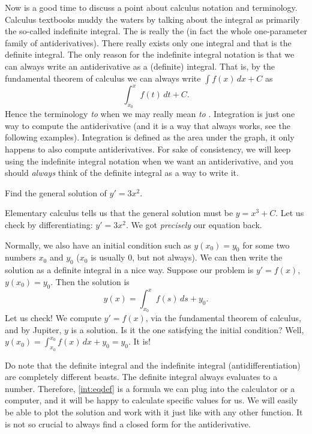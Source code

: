 Now is a good time to discuss a point about
calculus notation and terminology.  Calculus
textbooks muddy the waters by talking about the integral as primarily the
so-called indefinite integral.  The 
is really the \emph{} 
(in fact the whole one-parameter family
of antiderivatives).  There really exists only one integral and that
is the definite integral.
The only reason for the indefinite integral notation is that we can always
write an antiderivative as a (definite) integral.  That is, by the fundamental
theorem of calculus we can always write
$\int f(x) \,dx + C$ as
\begin{equation*}
\int_{x_0}^x f(t) \,dt + C .
\end{equation*}
Hence the terminology \emph{to } when we may really mean
\emph{to }.
Integration is just one way to compute the
antiderivative (and it is a way that always works, see the following
examples).  Integration is defined as the area under the graph, it
only happens to also compute antiderivatives.
For sake of consistency, we will keep using the
indefinite integral notation when we want an antiderivative,
and you should \emph{always} think of the definite integral
as a way to write it.

\begin{example}
Find the general solution of $y' = 3 x^2$.

Elementary calculus tells us
that the general solution must be $y = x^3 + C$.  Let us check by
differentiating:
$y' = 3x^2$.  We got \emph{precisely} our equation back.
\end{example}

Normally, we also have an initial condition such as $y(x_0) = y_0$
for some two numbers $x_0$ and $y_0$ ($x_0$ is usually 0, but not always).
We can then write the solution as a definite integral in a nice way.
Suppose our problem is $y' = f(x)$, $y(x_0) = y_0$.  Then the solution is
\begin{equation} \label{int:eqdef}
y(x) = \int_{x_0}^x f(s) \,ds + y_0 .
\end{equation}
Let us check!
We compute
$y' = f(x)$, via the fundamental theorem of calculus, and by Jupiter, $y$ is a
solution.  Is it the one satisfying the initial condition?  Well,
$y(x_0) = \int_{x_0}^{x_0} f(x)\,dx + y_0 = y_0$.  It is!

Do note that the definite integral and the indefinite integral
(antidifferentiation) are completely different beasts.  The definite integral
always evaluates to a number.  Therefore, \eqref{int:eqdef} is a formula we
can plug into the calculator or a computer, and it will be happy to calculate
specific values for us.  We will easily be able to plot the
solution and work with it just like with any other function.
It is not so crucial to always find a
closed form for the antiderivative.

